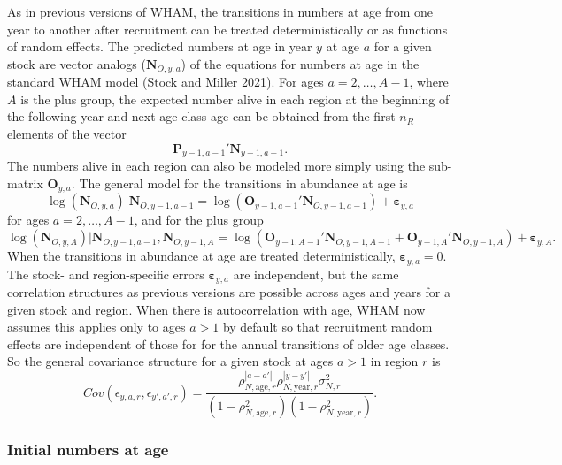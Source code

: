 \documentclass[
]{article}
\begin{document}
As in previous versions of WHAM, the transitions in numbers at age from
one year to another after recruitment can be treated deterministically
or as functions of random effects. The predicted numbers at age in year
\(y\) at age \(a\) for a given stock are vector analogs
(\(\mathbf{N}_{O,y,a}\)) of the equations for numbers at age in the
standard WHAM model (Stock and Miller 2021). For ages
\(a = 2,\ldots, A-1\), where \(A\) is the plus group, the expected
number alive in each region at the beginning of the following year and
next age class age can be obtained from the first \(n_R\) elements of
the vector \[\mathbf{P}_{y-1,a-1}' \mathbf{N}_{y-1,a-1}.\] The numbers
alive in each region can also be modeled more simply using the
sub-matrix \(\mathbf{O}_{y,a}\). The general model for the transitions
in abundance at age is \begin{equation*}
\log\left(\mathbf{N}_{O,y,a}\right)|\mathbf{N}_{O,y-1,a-1} =  \log\left(\mathbf{O}_{y-1,a-1}' \mathbf{N}_{O,y-1,a-1}\right) + \boldsymbol{\varepsilon}_{y,a}
\end{equation*} for ages \(a = 2,\ldots, A-1\), and for the plus group
\begin{equation*}
\log\left(\mathbf{N}_{O,y,A}\right)|\mathbf{N}_{O,y-1,a-1},\mathbf{N}_{O,y-1,A} = \log\left(\mathbf{O}_{y-1,A-1}' \mathbf{N}_{O,y-1,A-1} + \mathbf{O}_{y-1,A}' \mathbf{N}_{O,y-1,A}\right) + \boldsymbol{\varepsilon}_{y,A}.
\end{equation*} When the transitions in abundance at age are treated
deterministically, \(\boldsymbol{\varepsilon}_{y,a} = 0\). The stock-
and region-specific errors \(\boldsymbol{\varepsilon}_{y,a}\) are
independent, but the same correlation structures as previous versions
are possible across ages and years for a given stock and region. When
there is autocorrelation with age, WHAM now assumes this applies only to
ages \(a>1\) by default so that recruitment random effects are
independent of those for for the annual transitions of older age
classes. So the general covariance structure for a given stock at ages
\(a>1\) in region \(r\) is \begin{equation*}
  Cov\left(\epsilon_{y,a,r},\epsilon_{y',a',r}\right) =   \frac{\rho_{N,\text{age},r}^{|a-a'|}\rho_{N,\text{year},r}^{|y-y'|}\sigma^2_{N,r}}{\left(1 -  \rho_{N,\text{age},r}^2\right)\left(1 - \rho_{N,\text{year},r}^2\right)}.
\end{equation*}

\hypertarget{initial-numbers-at-age}{%
\subsubsection*{Initial numbers at age}\label{initial-numbers-at-age}}
\end{document}
